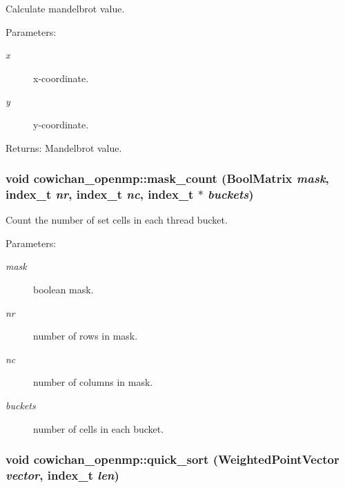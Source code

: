 Calculate mandelbrot value. \begin{Desc}
\item[Parameters:]
\begin{description}
\item[{\em x}]x-coordinate. \item[{\em y}]y-coordinate. \end{description}
\end{Desc}
\begin{Desc}
\item[Returns:]Mandelbrot value. \end{Desc}
\hypertarget{namespacecowichan__openmp_9c68e88badede2262dd4ded923e804dc}{
\subsubsection[{mask\_\-count}]{\setlength{\rightskip}{0pt plus 5cm}void cowichan\_\-openmp::mask\_\-count ({\bf BoolMatrix} {\em mask}, \/  {\bf index\_\-t} {\em nr}, \/  {\bf index\_\-t} {\em nc}, \/  {\bf index\_\-t} $\ast$ {\em buckets})}}
\label{namespacecowichan__openmp_9c68e88badede2262dd4ded923e804dc}


Count the number of set cells in each thread bucket. \begin{Desc}
\item[Parameters:]
\begin{description}
\item[{\em mask}]boolean mask. \item[{\em nr}]number of rows in mask. \item[{\em nc}]number of columns in mask. \item[{\em buckets}]number of cells in each bucket. \end{description}
\end{Desc}
\hypertarget{namespacecowichan__openmp_64208258cab6e46db879b46b40581134}{
\subsubsection[{quick\_\-sort}]{\setlength{\rightskip}{0pt plus 5cm}void cowichan\_\-openmp::quick\_\-sort ({\bf WeightedPointVector} {\em vector}, \/  {\bf index\_\-t} {\em len})}}
\label{namespacecowichan__openmp_64208258cab6e46db879b46b40581134}


